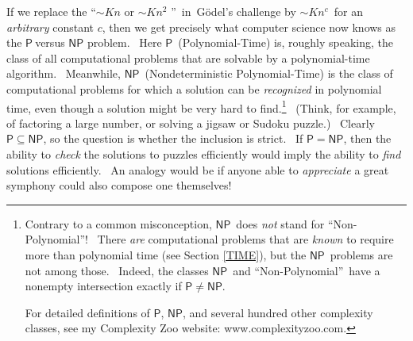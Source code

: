 \documentclass[12pt,onecolumn]{article}%
\begin{document}
If we replace the \textquotedblleft$\sim Kn$ or $\sim Kn^{2}$%
\textquotedblright\ in\ G\"{o}del's challenge by $\sim Kn^{c}$\ for an
\textit{arbitrary} constant $c$, then we get precisely what computer science
now knows as the $\mathsf{P}\ $versus $\mathsf{NP}$ problem. \ Here
$\mathsf{P}$\ (Polynomial-Time) is, roughly speaking, the class of all
computational problems that are solvable by a polynomial-time algorithm.
\ Meanwhile, $\mathsf{NP}$\ (Nondeterministic Polynomial-Time) is the class of
computational problems for which a solution can be \textit{recognized} in
polynomial time, even though a solution might be very hard to
find.\footnote{Contrary to a common misconception, $\mathsf{NP}$\ does
\textit{not} stand for \textquotedblleft Non-Polynomial\textquotedblright!
\ There \textit{are} computational problems that are \textit{known} to require
more than polynomial time (see Section \ref{TIME}), but the $\mathsf{NP}%
$\ problems are not among those. \ Indeed, the classes $\mathsf{NP}$\ and
\textquotedblleft Non-Polynomial\textquotedblright\ have a nonempty
intersection exactly if $\mathsf{P}\neq\mathsf{NP}$.
\par
For detailed definitions of $\mathsf{P}$, $\mathsf{NP}$, and several hundred
other complexity classes, see my Complexity Zoo website:
www.complexityzoo.com.} \ (Think, for example, of factoring a large number, or
solving a jigsaw or Sudoku puzzle.) \ Clearly $\mathsf{P}\subseteq\mathsf{NP}%
$, so the question is whether the inclusion is strict. \ If $\mathsf{P}%
=\mathsf{NP}$, then the ability to \textit{check} the solutions to puzzles
efficiently would imply the ability to \textit{find} solutions efficiently.
\ An analogy would be if anyone able to \textit{appreciate} a great symphony
could also compose one themselves!
\end{document}
